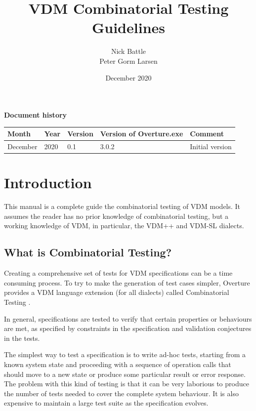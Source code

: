 \documentclass{overturerepchap}
\begin{document}
\title{VDM Combinatorial Testing Guidelines}
\author{Nick Battle\\
            Peter Gorm Larsen}

\date{December 2020}

\maketitle


{\textbf{Document history}}

\begin{tabular}{|l|l|l|l|l|}\hline
Month   & Year & Version & Version of Overture.exe & Comment \\ \hline
December   & 2020 &    0.1     & 3.0.2   & Initial version\\ \hline
\end{tabular}

\tableofcontents
\newpage
\mbox{}
\newpage
{}
\setcounter{page}{1}

\chapter{Introduction}

This manual is a complete guide the combinatorial testing of VDM models. It
assumes the reader has no prior knowledge of combinatorial testing, but a
working knowledge of VDM, in particular, the VDM++ and VDM-SL dialects.

\section{What is Combinatorial Testing?}

Creating a comprehensive set of tests for VDM specifications can be a time
consuming process. To try to make the generation of test cases simpler, Overture
provides a VDM language extension (for all dialects) called Combinatorial
Testing \cite{Nie&11,Larsen&10c}.

In general, specifications are tested to verify that certain properties or
behaviours are met, as specified by constraints in the specification and
validation conjectures in the tests.

The simplest way to test a specification is to write ad-hoc tests, starting from
a known system state and proceeding with a sequence of operation calls that
should move to a new state or produce some particular result or error response.
The problem with this kind of testing is that it can be very laborious to produce
the number of tests needed to cover the complete system behaviour. It is also
expensive to maintain a large test suite as the specification evolves.
\end{document}

